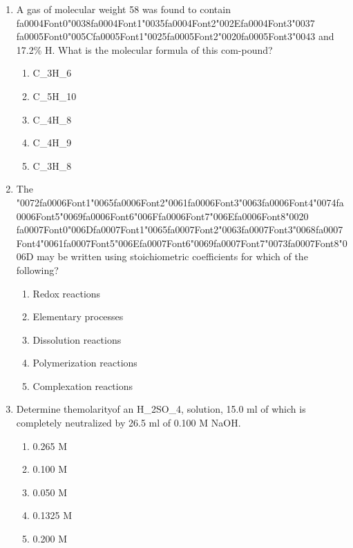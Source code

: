 \documentclass[12pt]{article}
\begin{document}
\begin{enumerate}[label=\arabic*.]
\begin{enumerate}[label=(\alph*)]
\end{enumerate}
\item A gas of molecular weight 58 was found to contain {\csname fa0004Font0\endcsname\char"0038}{\csname fa0004Font1\endcsname\char"0035}{\csname fa0004Font2\endcsname\char"002E}{\csname fa0004Font3\endcsname\char"0037} {\csname fa0005Font0\endcsname\char"005C}{\csname fa0005Font1\endcsname\char"0025}{\csname fa0005Font2\endcsname\char"0020}{\csname fa0005Font3\endcsname\char"0043} and 17.2\% H. What is the
molecular formula of this com-pound?
\begin{enumerate}[label=(\alph*)]
    \item C\_3H\_6
    \item C\_5H\_10
    \item C\_4H\_8
    \item C\_4H\_9
    \item C\_3H\_8
\end{enumerate}
\item The {\char"0072}{\csname fa0006Font1\endcsname\char"0065}{\csname fa0006Font2\endcsname\char"0061}{\csname fa0006Font3\endcsname\char"0063}{\csname fa0006Font4\endcsname\char"0074}{\csname fa0006Font5\endcsname\char"0069}{\csname fa0006Font6\endcsname\char"006F}{\csname fa0006Font7\endcsname\char"006E}{\csname fa0006Font8\endcsname\char"0020} {\csname fa0007Font0\endcsname\char"006D}{\csname fa0007Font1\endcsname\char"0065}{\csname fa0007Font2\endcsname\char"0063}{\csname fa0007Font3\endcsname\char"0068}{\csname fa0007Font4\endcsname\char"0061}{\csname fa0007Font5\endcsname\char"006E}{\csname fa0007Font6\endcsname\char"0069}{\csname fa0007Font7\endcsname\char"0073}{\csname fa0007Font8\endcsname\char"006D} may be written using stoichiometric coefficients for which of the following?
\begin{enumerate}[label=(\alph*)]
    \item Redox reactions
    \item Elementary processes
    \item Dissolution reactions
    \item Polymerization reactions
    \item Complexation reactions
\end{enumerate}
\item Determine themolarityof an H\_2SO\_4, solution, 15.0 ml of which is completely neutralized
by 26.5 ml of 0.100 M NaOH.
\begin{enumerate}[label=(\alph*)]
    \item 0.265 M
    \item 0.100 M
    \item 0.050 M
    \item 0.1325 M
    \item 0.200 M
\end{enumerate}
\end{enumerate}
\end{document}
